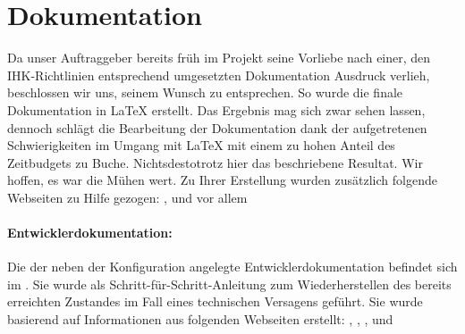 \section{Dokumentation}
\label{sec:Dokumentation}
Da unser Auftraggeber bereits früh im Projekt seine Vorliebe nach einer, den \ac{IHK}-Richtlinien entsprechend umgesetzten Dokumentation Ausdruck verlieh, beschlossen wir uns, seinem Wunsch zu entsprechen. So wurde die finale Dokumentation in \LaTeX{ } erstellt. Das Ergebnis mag sich zwar sehen lassen, dennoch schlägt die Bearbeitung der Dokumentation dank der aufgetretenen Schwierigkeiten im Umgang mit \LaTeX{} mit einem zu hohen Anteil des Zeitbudgets zu Buche. Nichtsdestotrotz hier das beschriebene Resultat. Wir hoffen, es war die Mühen wert. Zu Ihrer Erstellung wurden zusätzlich folgende Webseiten zu Hilfe gezogen: \cite{texstudio}, \cite{texbibtut} und vor allem \cite{manualdetailed}

\paragraph*{Entwicklerdokumentation:}
Die der neben der Konfiguration angelegte Entwicklerdokumentation befindet sich im . Sie wurde als Schritt-für-Schritt-Anleitung zum Wiederherstellen des bereits erreichten Zustandes im Fall eines technischen Versagens geführt. Sie wurde basierend auf Informationen aus folgenden Webseiten erstellt: \cite{debianOrg12}, \cite{debianOrg5}, \cite{iptableshowto}, \cite{iptablestutorial} und \cite{nathowto} 

